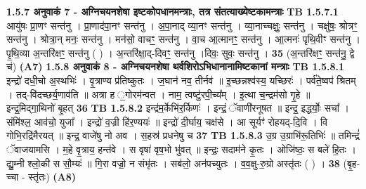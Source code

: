 \documentclass[17pt]{extarticle}
\begin{document}
                \textbf{ 1.5.7     अनुवाकं   7 - अग्निचयनशेषा इष्टकोपधानमन्त्राः, तत्र संतत्याख्येष्टकामन्त्राः} \newline
                                \textbf{ TB 1.5.7.1} \newline
                  आयु॑षः प्रा॒णꣳ सन्त॑नु । प्रा॒णाद॑पा॒नꣳ सन्त॑नु । अ॒पा॒नाद् व्या॒नꣳ सन्त॑नु । व्या॒नाच्चक्षुः॒ सन्त॑नु । चक्षु॑षः॒ श्रोत्रꣳ॒॒ सन्त॑नु । श्रोत्रा॒न् मनः॒ सन्त॑नु । मन॑सो॒ वाचꣳ॒॒ सन्त॑नु । वा॒च आ॒त्मानꣳ॒॒ सन्त॑नु । आ॒त्मनः॑ पृथि॒वीꣳ सन्त॑नु । पृ॒थि॒व्या अ॒न्तरि॑क्षꣳ॒॒ सन्त॑नु ( ) । अ॒न्तरि॑क्षा॒द्-दिवꣳ॒॒ सन्त॑नु ।दिवः॒ सुवः॒ सन्त॑नु । \textbf{ 35} \newline
                  \newline
                                    (अ॒न्तरि॑क्षꣳ॒॒ सन्त॑नु॒ द्वे च॑) \textbf{(A7)} \newline \newline
                \textbf{ 1.5.8      अनुवाकं   8 - अग्निचयनशेषा थर्वशिरोऽभिधानानामिष्टकानां मन्त्राः} \newline
                                \textbf{ TB 1.5.8.1} \newline
                  इन्द्रो॑ दधी॒चो अ॒स्थभिः॑ । वृ॒त्राण्य प्र॑तिष्कुतः । ज॒घान॑ नव॒ तीर्नव॑ ॥ इ॒च्छन्नश्व॑स्य॒ यच्छिरः॑ । पर्व॑ते॒ष्वप॑ श्रितम् । तद्-वि॑दच्छर्य॒णाव॑ति ॥ अत्रा ह ॒गोरम॑न्वत । नाम॒ त्वष्टु॑रपी॒च्य᳚म् । इ॒त्था च॒न्द्रम॑सो गृ॒हे ॥ इन्द्र॒मिद्गा॒थिनो॑ बृ॒हत् \textbf{ 36} \newline
                  \newline
                                \textbf{ TB 1.5.8.2} \newline
                  इन्द्र॑म॒र्केभि॑र॒र्किणः॑ । इन्द्रं॒ ॅवाणी॑रनूषत ॥ इन्द्र॒ इद्धर्योः॒ सचा᳚ । संमि॑श्ल॒ आव॑चो॒ युजा᳚ । इन्द्रो॑ व॒ज्री हि॑र॒ण्ययः॑ ॥ इन्द्रो॑ दी॒र्घाय॒ चक्ष॑से । आ सूर्यꣳ॑ रोहयद्-दि॒वि । वि गोभि॒रद्रि॑मैरयत् ॥ इन्द्र॒ वाजे॑षु नो अव । स॒हस्र॑ प्रधनेषु च \textbf{ 37} \newline
                  \newline
                                \textbf{ TB 1.5.8.3} \newline
                  उ॒ग्र उ॒ग्राभि॑रू॒तिभिः॑ ॥ तमिन्द्रं॑ ॅवाजयामसि । म॒हे वृ॒त्राय॒ हन्त॑वे । स वृषा॑ वृष॒भो भु॑वत् ॥ इन्द्रः॒ सदाम॑ने कृ॒तः । ओजि॑ष्ठः॒ स बले॑ हि॒तः । द्यु॒म्नी श्लो॒की स सौ॒म्यः॑ ॥ गि॒रा वज्रो॒ न संभृ॑तः । सब॑लो॒ अन॑पच्युतः । व॒व॒क्षु-रु॒ग्रो अस्तृ॑तः ( ) । \textbf{ 38} \newline
                  \newline
                                    (बृ॒ह- च्चा - स्तृ॑तः) \textbf{(A8)} \newline \newline
\end{document}
